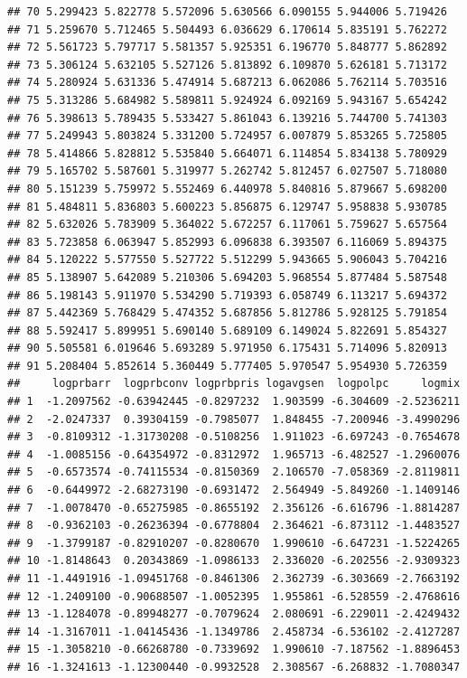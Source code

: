\documentclass[]{article}
\begin{document}
\begin{verbatim}
## 70 5.299423 5.822778 5.572096 5.630566 6.090155 5.944006 5.719426
## 71 5.259670 5.712465 5.504493 6.036629 6.170614 5.835191 5.762272
## 72 5.561723 5.797717 5.581357 5.925351 6.196770 5.848777 5.862892
## 73 5.306124 5.632105 5.527126 5.813892 6.109870 5.626181 5.713172
## 74 5.280924 5.631336 5.474914 5.687213 6.062086 5.762114 5.703516
## 75 5.313286 5.684982 5.589811 5.924924 6.092169 5.943167 5.654242
## 76 5.398613 5.789435 5.533427 5.861043 6.139216 5.744700 5.741303
## 77 5.249943 5.803824 5.331200 5.724957 6.007879 5.853265 5.725805
## 78 5.414866 5.828812 5.535840 5.664071 6.114854 5.834138 5.780929
## 79 5.165702 5.587601 5.319977 5.262742 5.812457 6.027507 5.718080
## 80 5.151239 5.759972 5.552469 6.440978 5.840816 5.879667 5.698200
## 81 5.484811 5.836803 5.600223 5.856875 6.129747 5.958838 5.930785
## 82 5.632026 5.783909 5.364022 5.672257 6.117061 5.759627 5.657564
## 83 5.723858 6.063947 5.852993 6.096838 6.393507 6.116069 5.894375
## 84 5.120222 5.577550 5.527722 5.512299 5.943665 5.906043 5.704216
## 85 5.138907 5.642089 5.210306 5.694203 5.968554 5.877484 5.587548
## 86 5.198143 5.911970 5.534290 5.719393 6.058749 6.113217 5.694372
## 87 5.442369 5.768429 5.474352 5.687856 5.812786 5.928125 5.791854
## 88 5.592417 5.899951 5.690140 5.689109 6.149024 5.822691 5.854327
## 90 5.505581 6.019646 5.693289 5.971950 6.175431 5.714096 5.820913
## 91 5.208404 5.852614 5.360449 5.777405 5.970547 5.954930 5.726359
##     logprbarr  logprbconv logprbpris logavgsen  logpolpc     logmix
## 1  -1.2097562 -0.63942445 -0.8297232  1.903599 -6.304609 -2.5236211
## 2  -2.0247337  0.39304159 -0.7985077  1.848455 -7.200946 -3.4990296
## 3  -0.8109312 -1.31730208 -0.5108256  1.911023 -6.697243 -0.7654678
## 4  -1.0085156 -0.64354972 -0.8312972  1.965713 -6.482527 -1.2960076
## 5  -0.6573574 -0.74115534 -0.8150369  2.106570 -7.058369 -2.8119811
## 6  -0.6449972 -2.68273190 -0.6931472  2.564949 -5.849260 -1.1409146
## 7  -1.0078470 -0.65275985 -0.8655192  2.356126 -6.616796 -1.8814287
## 8  -0.9362103 -0.26236394 -0.6778804  2.364621 -6.873112 -1.4483527
## 9  -1.3799187 -0.82910207 -0.8280670  1.990610 -6.647231 -1.5224265
## 10 -1.8148643  0.20343869 -1.0986133  2.336020 -6.202556 -2.9309323
## 11 -1.4491916 -1.09451768 -0.8461306  2.362739 -6.303669 -2.7663192
## 12 -1.2409100 -0.90688507 -1.0052395  1.955861 -6.528559 -2.4768616
## 13 -1.1284078 -0.89948277 -0.7079624  2.080691 -6.229011 -2.4249432
## 14 -1.3167011 -1.04145436 -1.1349786  2.458734 -6.536102 -2.4127287
## 15 -1.3058210 -0.66268780 -0.7339692  1.990610 -7.187562 -1.8896453
## 16 -1.3241613 -1.12300440 -0.9932528  2.308567 -6.268832 -1.7080347

\end{verbatim}
\end{document}
